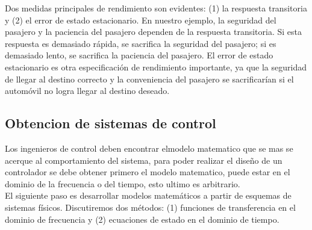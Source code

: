 Dos medidas principales de rendimiento son evidentes: (1) la respuesta transitoria y (2) el error
de estado estacionario. En nuestro ejemplo, la seguridad del pasajero y la paciencia del pasajero
dependen de la respuesta transitoria. Si esta respuesta es demasiado rápida, se sacrifica la
seguridad del pasajero; si es demasiado lento, se sacrifica la paciencia del pasajero.
El error de estado estacionario es otra especificación de rendimiento importante, ya que la seguridad
de llegar al destino correcto y la conveniencia del pasajero se sacrificarían si el automóvil no
logra llegar al destino deseado.

\subsection{Obtencion de sistemas de control}
Los ingenieros de control deben encontrar elmodelo matematico que se mas se acerque
al comportamiento del sistema, para poder realizar el diseño de un controlador se
debe obtener primero el modelo matematico, puede estar en el dominio de la frecuencia
o del tiempo, esto ultimo es arbitrario.\\
El siguiente paso es desarrollar modelos matemáticos a partir de esquemas de sistemas
físicos. Discutiremos dos métodos: (1) funciones de transferencia en el dominio de
frecuencia y (2) ecuaciones de estado en el dominio de tiempo.

